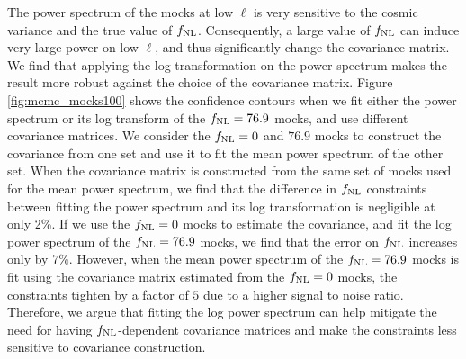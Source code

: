 The power spectrum of the mocks at low $\ell$ is very sensitive to the cosmic variance and the true value of $f_{\rm NL}$. Consequently, a large value of $f_{\rm NL}$ can induce very large power on low $\ell$, and thus significantly change the covariance matrix. We find that applying the log transformation on the power spectrum makes the result more robust against the choice of the covariance matrix. Figure \ref{fig:mcmc_mocks100} shows the confidence contours when we fit either the power spectrum or its log transform of the $f_{\rm NL}=76.9$ mocks, and use different covariance matrices. We consider the $f_{\rm NL}=0$ and $76.9$ mocks to construct the covariance from one set and use it to fit the mean power spectrum of the other set. When the covariance matrix is constructed from the same set of mocks used for the mean power spectrum, we find that the difference in $f_{\rm NL}$ constraints between fitting the power spectrum and its log transformation is negligible at only 2\%. If we use the $f_{\rm NL}=0$ mocks to estimate the covariance, and fit the log power spectrum of the $f_{\rm NL}=76.9$ mocks, we find that the error on $f_{\rm NL}$ increases only by $7\%$. However, when the mean power spectrum of the $f_{\rm NL}=76.9$ mocks is fit using the covariance matrix estimated from the $f_{\rm NL}=0$ mocks, the constraints tighten by a factor of $5$ due to a higher signal to noise ratio. Therefore, we argue that fitting the log power spectrum can help mitigate the need for having $f_{\rm NL}$-dependent covariance matrices and make the constraints less sensitive to covariance construction.


